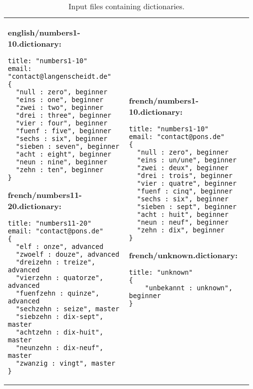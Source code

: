 \newpage
\begin{table}

\begin{tabular}{p{6cm} p{6cm} }
\footnotesize
\textbf{english/numbers1-10.dictionary:}
\begin{verbatim}
title: "numbers1-10"
email: "contact@langenscheidt.de"	
{
  "null : zero", beginner
  "eins : one", beginner
  "zwei : two", beginner
  "drei : three", beginner
  "vier : four", beginner
  "fuenf : five", beginner
  "sechs : six", beginner
  "sieben : seven", beginner
  "acht : eight", beginner
  "neun : nine", beginner
  "zehn : ten", beginner 
}
\end{verbatim} 

\vspace{0.5cm}

\footnotesize
\textbf{french/numbers11-20.dictionary:}
\begin{verbatim}
title: "numbers11-20"
email: "contact@pons.de"	
{
  "elf : onze", advanced
  "zwoelf : douze", advanced
  "dreizehn : treize", advanced
  "vierzehn : quatorze", advanced
  "fuenfzehn : quinze", advanced
  "sechzehn : seize", master
  "siebzehn : dix-sept", master
  "achtzehn : dix-huit", master
  "neunzehn : dix-neuf", master
  "zwanzig : vingt", master
}
\end{verbatim}
&

\footnotesize
\textbf{french/numbers1-10.dictionary:}
\begin{verbatim}   
title: "numbers1-10"
email: "contact@pons.de"	
{
  "null : zero", beginner
  "eins : un/une", beginner
  "zwei : deux", beginner
  "drei : trois", beginner
  "vier : quatre", beginner
  "fuenf : cinq", beginner
  "sechs : six", beginner
  "sieben : sept", beginner
  "acht : huit", beginner
  "neun : neuf", beginner
  "zehn : dix", beginner 
}
\end{verbatim}

\vspace{0.5cm}

\footnotesize
\textbf{french/unknown.dictionary:}
\begin{verbatim}
title: "unknown"
{
	"unbekannt : unknown", beginner
}
\end{verbatim}
  \\
\end{tabular}   
\caption{Input files containing dictionaries.}
\label{moca-inputdata}

\end{table}
\clearpage

